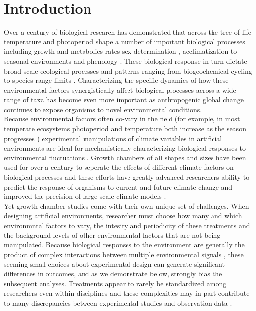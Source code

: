 \documentclass{article}[11pt]
\begin{document}
\section*{Introduction}

\noindent Over a century of biological research has demonstrated that across the tree of life temperature and photoperiod shape a number of important biological processes including growth and metabolics rates \citep{} sex determination \citep{}, acclimatization to seasonal environments \citep{} and phenology \citep{}. These biological response in turn dictate broad scale ecological processes and patterns ranging from biogeochemical cycling \citep{} to species range limits \citep{}. Characterizing the specific dynamics of how these environmental factors synergistically affect biological processes across a wide range of taxa has become even more important as anthropogenic global change continues to expose organisms to novel environmental conditions.\\

\noindent Because environmental factors often co-vary in the field (for example, in most temperate ecosystems photoperiod and temperature both increase as the season progresses \citep{}) experimental manipulations of climate variables in artificial environments are ideal for mechanistically characterizing biological responses to environmental fluctuations \citep{Ettinger_inprep,Primack2015}. Growth chambers of all shapes and sizes have been used for over a century to seperate the effects of different climate factors on biological processes \citep{} and these efforts have greatly advanced researchers ability to predict the response of organisms to current and future climate change and improved the precision of large scale climate models \citep{}.\\ 

\noindent Yet growth chamber studies come with their own unique set of challenges. When designing artificial environments, researcher must choose how many and which environmntal factors to vary, the intesity and periodicity of these treatments and the background levels of other environmental factors that are not being manipulated. Because biological responses to the environment are generally the product of complex interactions between multiple environmental signals \citep{}, these seeming small choices about experimental design can generate significant differences in outcomes, and as we demonstrate below, strongly bias the subsequent analyses. Treatments appear to rarely be standardized among researchers even within disciplines \citep{} and these complexities may in part contribute to many discrepancies between experimental studies and observation data \citep{}. 
\end{document}
